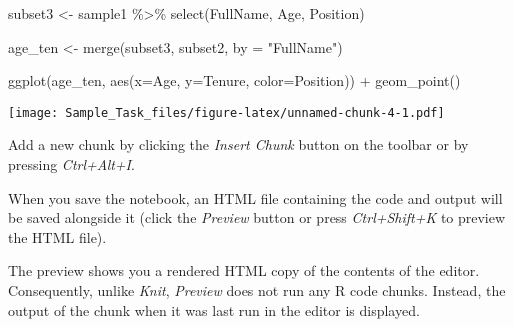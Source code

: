 \documentclass[
]{article}
\newenvironment{Shaded}{\begin{snugshade}}{\end{snugshade}}
\newcommand{\AttributeTok}[1]{\textcolor[rgb]{0.77,0.63,0.00}{#1}}
\newcommand{\FunctionTok}[1]{\textcolor[rgb]{0.00,0.00,0.00}{#1}}
\newcommand{\NormalTok}[1]{#1}
\newcommand{\OtherTok}[1]{\textcolor[rgb]{0.56,0.35,0.01}{#1}}
\newcommand{\SpecialCharTok}[1]{\textcolor[rgb]{0.00,0.00,0.00}{#1}}
\newcommand{\StringTok}[1]{\textcolor[rgb]{0.31,0.60,0.02}{#1}}
\begin{document}
\begin{Shaded}
\begin{Highlighting}[]
\NormalTok{subset3 }\OtherTok{\textless{}{-}}\NormalTok{ sample1 }\SpecialCharTok{\%\textgreater{}\%}
  \FunctionTok{select}\NormalTok{(FullName, Age, Position)}

\NormalTok{age\_ten }\OtherTok{\textless{}{-}} \FunctionTok{merge}\NormalTok{(subset3, subset2, }\AttributeTok{by =} \StringTok{"FullName"}\NormalTok{)}

\FunctionTok{ggplot}\NormalTok{(age\_ten, }\FunctionTok{aes}\NormalTok{(}\AttributeTok{x=}\NormalTok{Age, }\AttributeTok{y=}\NormalTok{Tenure, }\AttributeTok{color=}\NormalTok{Position)) }\SpecialCharTok{+} \FunctionTok{geom\_point}\NormalTok{()}
\end{Highlighting}
\end{Shaded}

\texttt{[image: Sample\_Task\_files/figure-latex/unnamed-chunk-4-1.pdf]}

Add a new chunk by clicking the \emph{Insert Chunk} button on the
toolbar or by pressing \emph{Ctrl+Alt+I}.

When you save the notebook, an HTML file containing the code and output
will be saved alongside it (click the \emph{Preview} button or press
\emph{Ctrl+Shift+K} to preview the HTML file).

The preview shows you a rendered HTML copy of the contents of the
editor. Consequently, unlike \emph{Knit}, \emph{Preview} does not run
any R code chunks. Instead, the output of the chunk when it was last run
in the editor is displayed.
\end{document}
